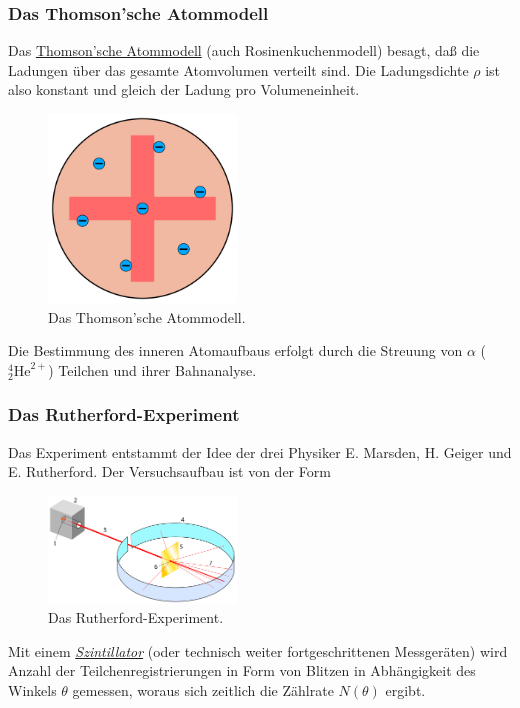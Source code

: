 \documentclass[]{subfiles}
\begin{document}
        \subsubsection*{Das Thomson'sche Atommodell}\label{Ub:ThomsonAtom}\marginnote{$\to$ \hyperref[Ub:AtomEigenschaften]{\faBook}}
            Das \href{https://de.wikipedia.org/wiki/Thomsonsches_Atommodell}{Thomson'sche Atommodell} (auch Rosinenkuchenmodell) besagt, daß die Ladungen über das gesamte Atomvolumen verteilt sind. Die Ladungsdichte $\rho$ ist also konstant und gleich der Ladung pro Volumeneinheit. 
            \begin{figure}[H]
                \centering
                \includegraphics[width=5cm]{Bilddateien/ThomsonModell.png}
                \caption{Das Thomson'sche Atommodell.}
                \label{fig:ThomsonAtom}
            \end{figure}
            Die Bestimmung des inneren Atomaufbaus erfolgt durch die Streuung von $\alpha$ ($_2^4\text{He}^{2+}$) Teilchen und ihrer Bahnanalyse. 

        \subsubsection*{Das Rutherford-Experiment}\label{Ub:RutherfordExp}\marginnote{$\to$ \hyperref[Ub:AtomEigenschaften]{\faBook}}
            Das Experiment entstammt der Idee der drei Physiker E. Marsden, H. Geiger und E. Rutherford. 
            Der Versuchsaufbau ist von der Form 
            \begin{figure}[H]
                \centering
                \includegraphics[width=5cm]{Bilddateien/Streuversuch_Rutherford.svg.png}
                \caption{Das Rutherford-Experiment.}
                \label{fig:RutherfordExperiment}
            \end{figure}
            Mit einem \href{https://de.wikipedia.org/wiki/Szintillator}{\emph{Szintillator}} (oder technisch weiter fortgeschrittenen Messgeräten) wird Anzahl der Teilchenregistrierungen in Form von Blitzen in Abhängigkeit des Winkels $\theta$ gemessen, woraus sich zeitlich die Zählrate $N(\theta)$ ergibt. 
\end{document}
